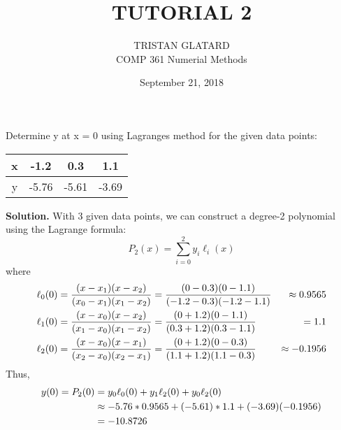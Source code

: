 

 

\title{TUTORIAL 2}%
\author{TRISTAN GLATARD\\ %
COMP 361 Numerial Methods} %
\date{September 21, 2018} 
\maketitle

\begin{exercise}{1} %
Determine y at x = 0 using Lagrange\textquotesingle s method for the given data points:\\
\begin{table}[h]
\centering
\begin{tabular}{|c|c|c|c|}
\hline
x & -1.2 & 0.3 & 1.1 \\ \hline
y & -5.76 & -5.61 & -3.69 \\ \hline
\end{tabular}
\end{table}

\textbf{Solution.} With 3 given data points, we can construct a degree-2 polynomial using the Lagrange formula:\\
$$P_{2}(x)=\sum_{i=0}^2 y_{i}\ell_{i}(x)$$
where
\begin{align}
\ell_{0}(0)&=\frac{(x-x_1)(x-x_2)}{(x_0-x_1)(x_1-x_2)}=\frac{(0-0.3)(0-1.1)}{(-1.2-0.3)(-1.2-1.1)}&\approx 0.9565 \notag\\
\ell_{1}(0)&=\frac{(x-x_0)(x-x_2)}{(x_1-x_0)(x_1-x_2)}=\frac{(0+1.2)(0-1.1)}{(0.3+1.2)(0.3-1.1)}&= 1.1 \notag\\
\notag 
\ell_{2}(0)&=\frac{(x-x_0)(x-x_1)}{(x_2-x_0)(x_2-x_1)}=\frac{(0+1.2)(0-0.3)}{(1.1+1.2)(1.1-0.3)}&\approx -0.1956
\end{align}
Thus,
\begin{align}
\notag
y(0) = P_{2}(0) &=y_0\ell_0(0) + y_1\ell_2(0) + y_0\ell_2(0)\\ 
\notag
&\approx -5.76*0.9565 + (-5.61)*1.1+(-3.69)(-0.1956) 
\notag
\\&=-10.8726
\notag
\end{align}
\end{exercise}

